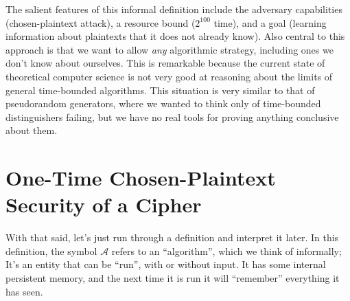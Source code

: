 \documentclass[11pt]{article}
\newcommand{\calA}{\mathcal{A}}
\begin{document}
The salient features of this informal definition include the adversary
capabilities (chosen-plaintext attack), a resource bound ($2^{100}$ time), and
a goal (learning information about plaintexts that it does not already know).
Also central to this approach is that we want to allow \emph{any} algorithmic
strategy, including ones we don't know about ourselves. This is remarkable
because the current state of theoretical computer science is not very good at
reasoning about the limits of general time-bounded algorithms. This situation
is very similar to that of pseudorandom generators, where we wanted to think
only of time-bounded distinguishers failing, but we have no real tools for
proving anything conclusive about them.

\section{One-Time Chosen-Plaintext Security of a Cipher}

With that said, let's just run through a definition and interpret it later.  
In this definition, the symbol $\calA$ refers to an ``algorithm'', which we
think of informally; It's an entity that can be ``run'', with or without
input. It has some internal persistent memory, and the next time it is run
it will ``remember'' everything it has seen.
\end{document}
